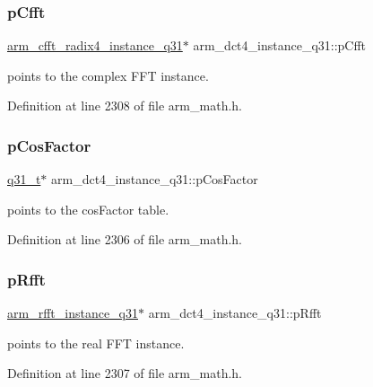 \subsubsection{\texorpdfstring{p\+Cfft}{pCfft}}
{\footnotesize\ttfamily \hyperlink{structarm__cfft__radix4__instance__q31}{arm\+\_\+cfft\+\_\+radix4\+\_\+instance\+\_\+q31}$\ast$ arm\+\_\+dct4\+\_\+instance\+\_\+q31\+::p\+Cfft}

points to the complex F\+FT instance. 

Definition at line 2308 of file arm\+\_\+math.\+h.

\mbox{\label{structarm__dct4__instance__q31_af97204d1838925621fc82021a0c2d6c1}} 
\subsubsection{\texorpdfstring{p\+Cos\+Factor}{pCosFactor}}
{\footnotesize\ttfamily \hyperlink{arm__math_8h_adc89a3547f5324b7b3b95adec3806bc0}{q31\+\_\+t}$\ast$ arm\+\_\+dct4\+\_\+instance\+\_\+q31\+::p\+Cos\+Factor}

points to the cos\+Factor table. 

Definition at line 2306 of file arm\+\_\+math.\+h.

\mbox{\label{structarm__dct4__instance__q31_af1487dab5e7963b85dc0fdc6bf492542}} 
\subsubsection{\texorpdfstring{p\+Rfft}{pRfft}}
{\footnotesize\ttfamily \hyperlink{structarm__rfft__instance__q31}{arm\+\_\+rfft\+\_\+instance\+\_\+q31}$\ast$ arm\+\_\+dct4\+\_\+instance\+\_\+q31\+::p\+Rfft}

points to the real F\+FT instance. 

Definition at line 2307 of file arm\+\_\+math.\+h.

\mbox{\label{structarm__dct4__instance__q31_a7db236e22673146bb1d2c962f0713f08}} 
